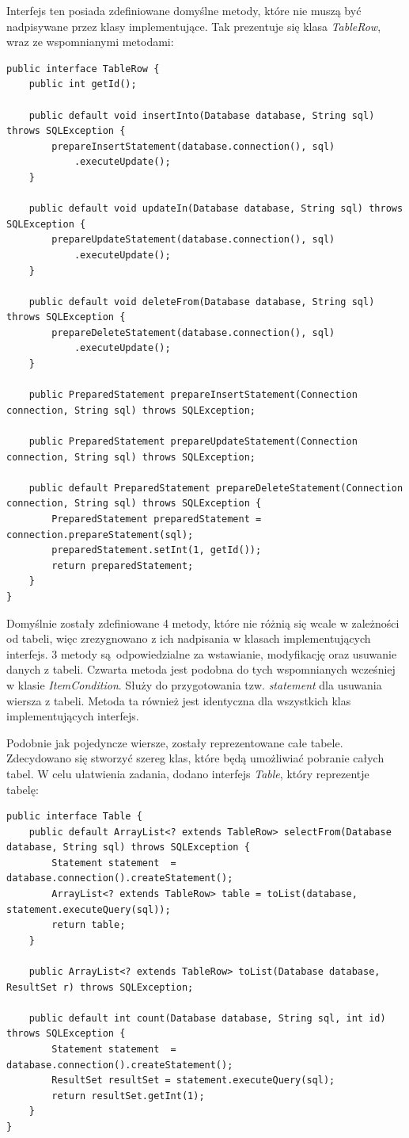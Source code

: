 Interfejs ten posiada zdefiniowane domyślne metody, które nie muszą być nadpisywane przez klasy implementujące. Tak prezentuje się klasa \emph{TableRow}, wraz ze wspomnianymi metodami:

\begin{lstlisting}[style=Java]
public interface TableRow {
	public int getId();

	public default void insertInto(Database database, String sql) throws SQLException {
		prepareInsertStatement(database.connection(), sql)
			.executeUpdate();
	}

	public default void updateIn(Database database, String sql) throws SQLException {
		prepareUpdateStatement(database.connection(), sql)
			.executeUpdate();
	}

	public default void deleteFrom(Database database, String sql) throws SQLException {
		prepareDeleteStatement(database.connection(), sql)
			.executeUpdate();
	}

	public PreparedStatement prepareInsertStatement(Connection connection, String sql) throws SQLException;

	public PreparedStatement prepareUpdateStatement(Connection connection, String sql) throws SQLException;

	public default PreparedStatement prepareDeleteStatement(Connection connection, String sql) throws SQLException {
		PreparedStatement preparedStatement = connection.prepareStatement(sql);
		preparedStatement.setInt(1, getId());
		return preparedStatement;
	}
}
\end{lstlisting}

Domyślnie zostały zdefiniowane 4 metody, które nie różnią się wcale w zależności od tabeli, więc zrezygnowano z ich nadpisania w klasach implementujących interfejs. 3 metody są~odpowiedzialne za wstawianie, modyfikację oraz usuwanie danych z tabeli. Czwarta metoda jest podobna do tych wspomnianych wcześniej w klasie \emph{ItemCondition}. Służy do przygotowania tzw. \emph{statement} dla usuwania wiersza z tabeli. Metoda ta również jest identyczna dla wszystkich klas implementujących interfejs.

Podobnie jak pojedyncze wiersze, zostały reprezentowane całe tabele. Zdecydowano się stworzyć szereg klas, które będą umożliwiać pobranie całych tabel. W celu ułatwienia zadania, dodano interfejs \emph{Table}, który reprezentje tabelę:

\begin{lstlisting}[style=Java]
public interface Table {
	public default ArrayList<? extends TableRow> selectFrom(Database database, String sql) throws SQLException {
		Statement statement  = database.connection().createStatement();
		ArrayList<? extends TableRow> table = toList(database, statement.executeQuery(sql));
		return table;
	}

	public ArrayList<? extends TableRow> toList(Database database, ResultSet r) throws SQLException;

	public default int count(Database database, String sql, int id) throws SQLException {
		Statement statement  = database.connection().createStatement();
		ResultSet resultSet = statement.executeQuery(sql);
		return resultSet.getInt(1);
	}
}
\end{lstlisting}

